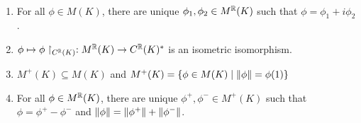 \documentclass{article}
\begin{document}
\begin{lem}\label{lem:m-real-pos}~
  \begin{enumerate}
    \item For all $\phi \in M(K)$, there are unique $\phi_1, \phi_2 \in M^\mathbb R(K)$ such that $\phi = \phi_1 + i\phi_2$.
    \item $\phi \mapsto \phi\restriction_{C^\mathbb R(K)} : M^\mathbb R(K) \to C^\mathbb R(K)^*$ is an isometric isomorphism.
    \item $M^+(K) \subseteq M(K)$ and $M^+(K) = \{\phi \in M(K) \mid \left\lVert \phi\right\rVert = \phi(1)\}$
    \item For all $\phi \in M^\mathbb R(K)$, there are unique $\phi^+, \phi^- \in M^+(K)$ such that $\phi = \phi^+ - \phi^-$ and $\left\lVert \phi\right\rVert = \left\lVert \phi^+\right\rVert + \left\lVert \phi^-\right\rVert$.
  \end{enumerate}
\end{lem}
\end{document}
